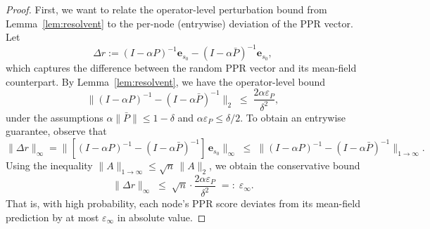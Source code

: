 \documentclass[11pt,english]{article}
\begin{document}
\begin{proof}
\label{proof_theorem}
First, we want to relate the operator-level perturbation bound from Lemma~\ref{lem:resolvent} to the per-node (entrywise) deviation of the PPR vector.
Let
\[
\Delta r := (I - \alpha P)^{-1}\mathbf{e}_{s_0} - (I - \alpha \bar P)^{-1}\mathbf{e}_{s_0},
\]
which captures the difference between the random PPR vector and its mean-field counterpart.
By Lemma~\ref{lem:resolvent}, we have the operator-level bound
\[
\|(I - \alpha P)^{-1} - (I - \alpha \bar P)^{-1}\|_2 \;\le\; \frac{2\alpha\varepsilon_P}{\delta^2},
\]
under the assumptions $\alpha\|\bar P\| \le 1-\delta$ and $\alpha\varepsilon_P \le \delta/2$. To obtain an entrywise guarantee, observe that
\[
\|\Delta r\|_\infty
= \|[(I - \alpha P)^{-1} - (I - \alpha \bar P)^{-1}]\,\mathbf{e}_{s_0}\|_\infty
\;\le\;
\|(I - \alpha P)^{-1} - (I - \alpha \bar P)^{-1}\|_{1\to\infty}.
\]
Using the inequality $\|A\|_{1\to\infty} \le \sqrt{n}\,\|A\|_2$,
we obtain the conservative bound
\[
\|\Delta r\|_\infty
\;\le\; \sqrt{n}\cdot\frac{2\alpha\varepsilon_P}{\delta^2}
\;=:\; \varepsilon_{\infty}.
\]
That is, with high probability, each node's PPR score deviates from its mean-field prediction
by at most $\varepsilon_{\infty}$ in absolute value.


\end{proof}
\end{document}
